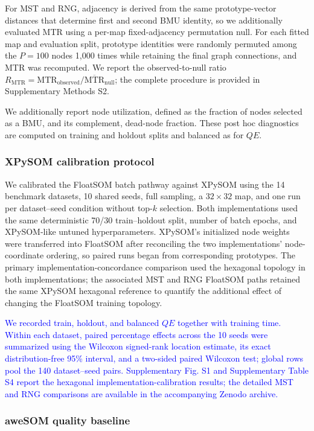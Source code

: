 \documentclass[10pt]{article} %
\newcommand{\TrackedChange}[1]{\textcolor{blue}{#1}}
\begin{document}
For MST and RNG, adjacency is derived from the same prototype-vector distances that determine first and second BMU identity, so we additionally evaluated MTR using a per-map fixed-adjacency permutation null. For each fitted map and evaluation split, prototype identities were randomly permuted among the $P=100$ nodes 1,000 times while retaining the final graph connections, and MTR was recomputed. We report the observed-to-null ratio $R_{\mathrm{MTR}}=\mathrm{MTR}_{\mathrm{observed}}/\overline{\mathrm{MTR}}_{\mathrm{null}}$; the complete procedure is provided in Supplementary Methods S2.

We additionally report node utilization, defined as the fraction of nodes selected as a BMU, and its complement, dead-node fraction. These post hoc diagnostics are computed on training and holdout splits and balanced as for $QE$.

\subsubsection{XPySOM calibration protocol}

We calibrated the FloatSOM batch pathway against XPySOM using the 14 benchmark datasets, 10 shared seeds, full sampling, a $32\times32$ map, and one run per dataset--seed condition without top-$k$ selection. Both implementations used the same deterministic 70/30 train--holdout split, number of batch epochs, and XPySOM-like untuned hyperparameters. XPySOM's initialized node weights were transferred into FloatSOM after reconciling the two implementations' node-coordinate ordering, so paired runs began from corresponding prototypes. The primary implementation-concordance comparison used the hexagonal topology in both implementations; the associated MST and RNG FloatSOM paths retained the same XPySOM hexagonal reference to quantify the additional effect of changing the FloatSOM training topology.

\TrackedChange{We recorded train, holdout, and balanced $QE$ together with training time. Within each dataset, paired percentage effects across the 10 seeds were summarized using the Wilcoxon signed-rank location estimate, its exact distribution-free 95\% interval, and a two-sided paired Wilcoxon test; global rows pool the 140 dataset--seed pairs. Supplementary Fig. S1 and Supplementary Table S4 report the hexagonal implementation-calibration results; the detailed MST and RNG comparisons are available in the accompanying Zenodo archive.}

\subsubsection{aweSOM quality baseline}
\end{document}
